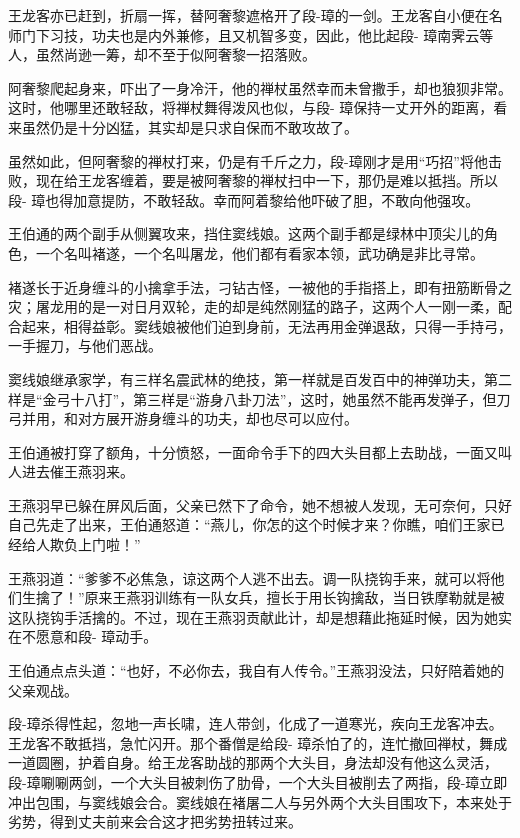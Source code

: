\documentclass[12pt,oneside]{book}
\begin{document}
王龙客亦已赶到，折扇一挥，替阿奢黎遮格开了段-璋的一剑。王龙客自小便在名师门下习技，功夫也是内外兼修，且又机智多变，因此，他比起段-
璋南霁云等人，虽然尚逊一筹，却不至于似阿奢黎一招落败。

阿奢黎爬起身来，吓出了一身冷汗，他的禅杖虽然幸而未曾撒手，却也狼狈非常。这时，他哪里还敢轻敌，将禅杖舞得泼风也似，与段-
璋保持一丈开外的距离，看来虽然仍是十分凶猛，其实却是只求自保而不敢攻故了。

虽然如此，但阿奢黎的禅杖打来，仍是有千斤之力，段-璋刚才是用``巧招''将他击败，现在给王龙客缠着，要是被阿奢黎的禅杖扫中一下，那仍是难以抵挡。所以段-
璋也得加意提防，不敢轻敌。幸而阿着黎给他吓破了胆，不敢向他强攻。

王伯通的两个副手从侧翼攻来，挡住窦线娘。这两个副手都是绿林中顶尖儿的角色，一个名叫褚遂，一个名叫屠龙，他们都有看家本领，武功确是非比寻常。

褚遂长于近身缠斗的小擒拿手法，刁钻古怪，一被他的手指搭上，即有扭筋断骨之灾；屠龙用的是一对日月双轮，走的却是纯然刚猛的路子，这两个人一刚一柔，配合起来，相得益彰。窦线娘被他们迫到身前，无法再用金弹退敌，只得一手持弓，一手握刀，与他们恶战。

窦线娘继承家学，有三样名震武林的绝技，第一样就是百发百中的神弹功夫，第二样是``金弓十八打''，第三样是``游身八卦刀法''，这时，她虽然不能再发弹子，但刀弓并用，和对方展开游身缠斗的功夫，却也尽可以应付。

王伯通被打穿了额角，十分愤怒，一面命令手下的四大头目都上去助战，一面又叫人进去催王燕羽来。

王燕羽早已躲在屏风后面，父亲已然下了命令，她不想被人发现，无可奈何，只好自己先走了出来，王伯通怒道：``燕儿，你怎的这个时候才来？你瞧，咱们王家已经给人欺负上门啦！''

王燕羽道：``爹爹不必焦急，谅这两个人逃不出去。调一队挠钩手来，就可以将他们生擒了！''原来王燕羽训练有一队女兵，擅长于用长钩擒敌，当日铁摩勒就是被这队挠钩手活擒的。不过，现在王燕羽贡献此计，却是想藉此拖延时候，因为她实在不愿意和段-
璋动手。

王伯通点点头道：``也好，不必你去，我自有人传令。''王燕羽没法，只好陪着她的父亲观战。

段-璋杀得性起，忽地一声长啸，连人带剑，化成了一道寒光，疾向王龙客冲去。王龙客不敢抵挡，急忙闪开。那个番僧是给段-
璋杀怕了的，连忙撤回禅杖，舞成一道圆圈，护着自身。给王龙客助战的那两个大头目，身法却没有他这么灵活，段-璋唰唰两剑，一个大头目被刺伤了肋骨，一个大头目被削去了两指，段-璋立即冲出包围，与窦线娘会合。窦线娘在褚屠二人与另外两个大头目围攻下，本来处于劣势，得到丈夫前来会合这才把劣势扭转过来。
\end{document}
